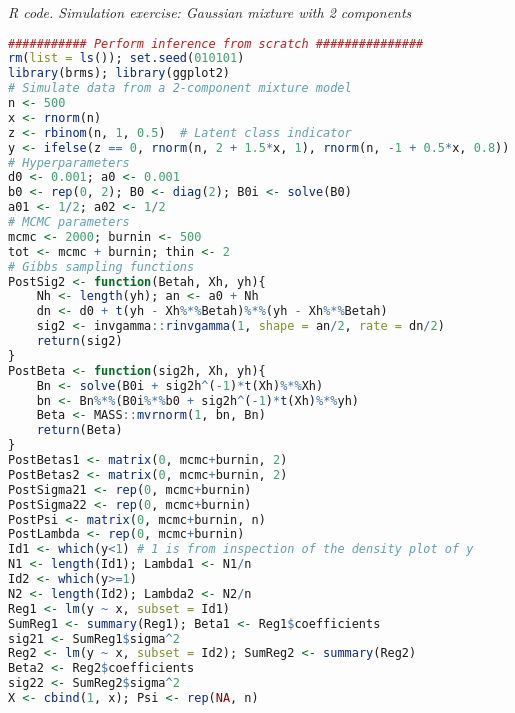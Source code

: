 \begin{tcolorbox}[enhanced,width=4.67in,center upper,
	fontupper=\large\bfseries,drop shadow southwest,sharp corners]
	\textit{R code. Simulation exercise: Gaussian mixture with 2 components}
	\begin{VF}
		\begin{lstlisting}[language=R]
########### Perform inference from scratch ###############
rm(list = ls()); set.seed(010101)
library(brms); library(ggplot2)
# Simulate data from a 2-component mixture model
n <- 500
x <- rnorm(n)
z <- rbinom(n, 1, 0.5)  # Latent class indicator
y <- ifelse(z == 0, rnorm(n, 2 + 1.5*x, 1), rnorm(n, -1 + 0.5*x, 0.8))
# Hyperparameters
d0 <- 0.001; a0 <- 0.001
b0 <- rep(0, 2); B0 <- diag(2); B0i <- solve(B0)
a01 <- 1/2; a02 <- 1/2
# MCMC parameters
mcmc <- 2000; burnin <- 500
tot <- mcmc + burnin; thin <- 2
# Gibbs sampling functions
PostSig2 <- function(Betah, Xh, yh){
	Nh <- length(yh); an <- a0 + Nh
	dn <- d0 + t(yh - Xh%*%Betah)%*%(yh - Xh%*%Betah)
	sig2 <- invgamma::rinvgamma(1, shape = an/2, rate = dn/2)
	return(sig2)
}
PostBeta <- function(sig2h, Xh, yh){
	Bn <- solve(B0i + sig2h^(-1)*t(Xh)%*%Xh)
	bn <- Bn%*%(B0i%*%b0 + sig2h^(-1)*t(Xh)%*%yh)
	Beta <- MASS::mvrnorm(1, bn, Bn)
	return(Beta)
}
PostBetas1 <- matrix(0, mcmc+burnin, 2)
PostBetas2 <- matrix(0, mcmc+burnin, 2)
PostSigma21 <- rep(0, mcmc+burnin)
PostSigma22 <- rep(0, mcmc+burnin)
PostPsi <- matrix(0, mcmc+burnin, n)
PostLambda <- rep(0, mcmc+burnin)
Id1 <- which(y<1) # 1 is from inspection of the density plot of y 
N1 <- length(Id1); Lambda1 <- N1/n
Id2 <- which(y>=1)
N2 <- length(Id2); Lambda2 <- N2/n
Reg1 <- lm(y ~ x, subset = Id1)
SumReg1 <- summary(Reg1); Beta1 <- Reg1$coefficients
sig21 <- SumReg1$sigma^2 
Reg2 <- lm(y ~ x, subset = Id2); SumReg2 <- summary(Reg2)
Beta2 <- Reg2$coefficients
sig22 <- SumReg2$sigma^2
X <- cbind(1, x); Psi <- rep(NA, n)
\end{lstlisting}
	\end{VF}
\end{tcolorbox}
 
